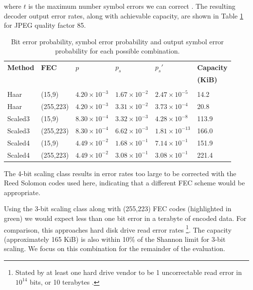 where $t$ is the maximum number symbol errors we can correct \cite{rsfec-decode}. The resulting decoder output error rates, along with achievable capacity, are shown in Table \ref{tab:fec} for JPEG quality factor 85.

\begin{table}[tbph]
  \begin{center}
        \begin{tabular}{l l l l l l}
            
            \textbf{Method} & \textbf{FEC} & \textbf{$p$} & \textbf{$p_s$} & \textbf{$p_s'$} & \textbf{Capacity} \\  & &  &  &  & \textbf{(KiB)} \\[0.1ex] \hline \\ [-1.5ex]

            Haar & (15,9) & $4.20 \times 10^{-3}$ & $1.67 \times 10^{-2}$ & $2.47 \times 10^{-5}$ & 14.2 \\
            Haar &  (255,223) & $4.20 \times 10^{-3}$ & $3.31 \times 10^{-2}$ & $3.73 \times 10^{-4}$ & 20.8 \\
            Scaled3 & (15,9) & $8.30 \times 10^{-4}$ & $3.32 \times 10^{-3}$ & $4.28 \times 10^{-8}
$ & 113.9 \\
            \rowcolor{green!20!white} Scaled3 & (255,223) & $8.30 \times 10^{-4}$ & $6.62 \times 10^{-3}$ & $1.81 \times 10^{-13}
$ & 166.0 \\
            Scaled4 & (15,9) & $4.49 \times 10^{-2}$ & $1.68 \times 10^{-1}$ & $7.14 \times 10^{-1}$ & 151.9 \\
            Scaled4 & (255,223) & $4.49 \times 10^{-2}$ & $3.08 \times 10^{-1}$ & $3.08
 \times 10^{-1}$ & 221.4 \\
            
        \end{tabular}
        \caption{Bit error probability, symbol error probability and output symbol error probability for each possible combination.}
        \label{tab:fec}
    \end{center}
\end{table}

The 4-bit scaling class results in error rates too large to be corrected with the Reed Solomon codes used here, indicating that a different FEC scheme would be appropriate.

Using the 3-bit scaling class along with (255,223) FEC codes (highlighted in green) we would expect less than one bit error in a terabyte of encoded data. For comparison, this approaches hard disk drive read error rates \footnote{Stated by at least one hard drive vendor to be 1 uncorrectable read error in $10^{14}$ bits, or 10 terabytes \cite{hdd-errors}.}. The capacity (approximately 165 KiB) is also within 10\% of the Shannon limit for 3-bit scaling. We focus on this combination for the remainder of the evaluation.



